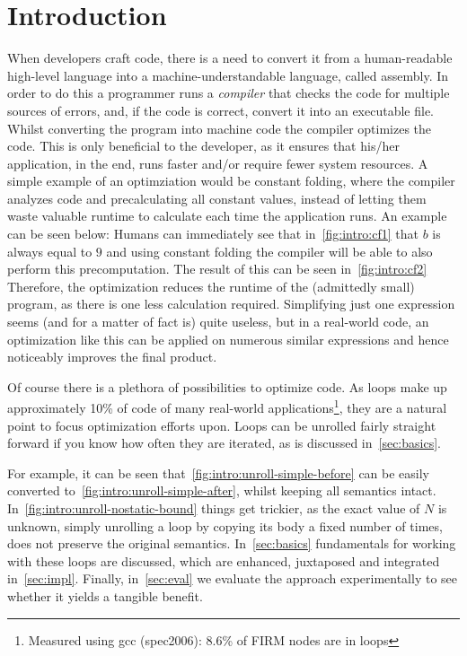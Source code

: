 \chapter{Introduction}\label{sec:intro}



When developers craft code, there is a need to convert it from a human-readable high-level language into a machine-understandable language, called assembly.
In order to do this a programmer runs a \textit{compiler} that checks the code for multiple sources of errors, and, if the code is correct, convert it into an executable file.
Whilst converting the program into machine code the compiler optimizes the code.
This is only beneficial to the developer, as it ensures that his/her application, in the end, runs faster and/or require fewer system resources.
A simple example of an optimziation would be constant folding, where the compiler analyzes code and precalculating all constant values, instead of letting them waste valuable runtime to calculate each time the application runs.
An example can be seen below:
Humans can immediately see that in~\cref{fig:intro:cf1} that $b$ is always equal to $9$ and using constant folding the compiler will be able to also perform this precomputation.
The result of this can be seen in~\cref{fig:intro:cf2}
Therefore, the optimization reduces the runtime of the (admittedly small) program, as there is one less calculation required.
Simplifying just one expression seems (and for a matter of fact is) quite useless, but in a real-world code, an optimization like this can be applied on numerous similar expressions and hence noticeably improves the final product.



Of course there is a plethora of possibilities to optimize code.
As loops make up approximately 10\% of code of many real-world applications\footnote{Measured using gcc (spec2006): 8.6\% of FIRM nodes are in loops}, they are a natural point to focus optimization efforts upon.
Loops can be unrolled fairly straight forward if you know how often they are iterated, as is discussed in~\cref{sec:basics}.

For example, it can be seen that~\cref{fig:intro:unroll-simple-before} can be easily converted to~\cref{fig:intro:unroll-simple-after}, whilst keeping all semantics intact.
In~\cref{fig:intro:unroll-nostatic-bound} things get trickier, as the exact value of $N$ is unknown, simply unrolling a loop by copying its body a fixed number of times, does not preserve the original semantics.
In~\cref{sec:basics} fundamentals for working with these loops are discussed, which are enhanced, juxtaposed and integrated in~\cref{sec:impl}.
Finally, in~\cref{sec:eval} we evaluate the approach experimentally to see whether it yields a tangible benefit.




